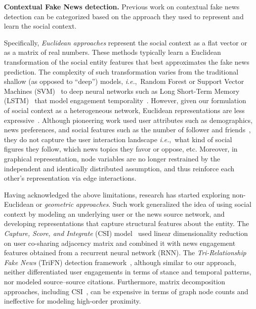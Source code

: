 \documentclass[sigconf,anonymous]{acmart}
\theoremstyle{definition}
\theoremstyle{hypothesis}
\begin{document}
\noindent\textbf{Contextual Fake News detection.}
Previous work on contextual fake news detection can be categorized based on the approach they used to represent and learn the social context. 

Specifically, \emph{Euclidean approaches} represent the social context as a flat vector or as a matrix of real numbers. 
These methods typically learn a Euclidean transformation of the social entity features that best approximates the fake news prediction. The complexity of such transformation varies from the traditional shallow (as opposed to ``deep'') models, \textit{i.e.},~Random Forest or Support Vector Machines (SVM)~\cite{castillo2011information,yang2012automatic} to deep neural networks such as Long Short-Term Memory (LSTM)~\cite{lstm1997hochreiter} that model engagement temporality~\cite{ruchansky2017csi}. However, given our formulation of social context as a heterogeneous network, Euclidean representations are less expressive~\cite{bronstein2017geometric}. Although pioneering work used user attributes such as demographics, news preferences, and social features such as the number of follower and friends~\cite{ma2015detect,shu2017fake}, they do not capture the user interaction landscape \textit{i.e.},~what kind of social figures they follow, which news topics they favor or oppose, etc. Moreover, in graphical representation, node variables are no longer restrained by the independent and identically distributed assumption, and thus reinforce each other's representation via edge interactions.

Having acknowledged the above limitations, research has started exploring non-Euclidean or \emph{geometric approaches}.
Such work generalized the idea of using social context by modeling an underlying user or the news source network, and developing representations that capture structural features about the entity. The \emph{Capture, Score, and Integrate} (CSI) model~\cite{ruchansky2017csi} used linear dimensionality reduction on user co-sharing adjacency matrix and combined it with news engagement features obtained from a recurrent neural network (RNN). The \emph{Tri-Relationship Fake News} (TriFN) detection framework~\cite{shu2019beyond}, although similar to our approach, neither differentiated user engagements in terms of stance and temporal patterns, nor modeled source--source citations. Furthermore, matrix decomposition approaches, including CSI~\cite{ruchansky2017csi}, can be expensive in terms of graph node counts and ineffective for modeling high-order proximity. 
\end{document}
